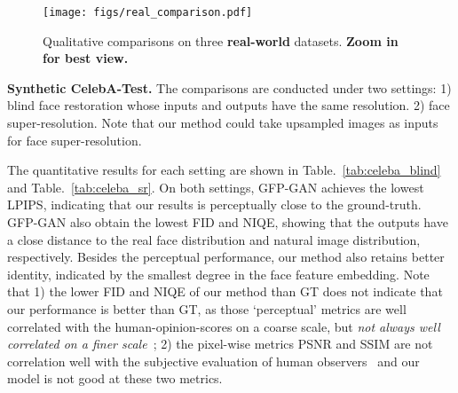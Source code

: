 \documentclass[final]{cvpr}
\begin{document}
\begin{figure*}[!t]
	\vspace{-0.5cm}
	\begin{center}
\texttt{[image: figs/real\_comparison.pdf]}
	\end{center}
	\vspace{-0.8cm}
	\caption{Qualitative comparisons on three \textbf{real-world} datasets. \textbf{Zoom in for best view.}}
	\label{fig:real_comparison}
	\vspace{-0.5cm}
\end{figure*}



\noindent\textbf{Synthetic CelebA-Test.}
The comparisons are conducted under two settings:  1) blind face restoration whose inputs and outputs have the same resolution. 2)  face super-resolution. Note that our method could take upsampled images as inputs for face super-resolution.

The quantitative results for each setting are shown in Table.~\ref{tab:celeba_blind} and Table.~\ref{tab:celeba_sr}. 
On both settings, GFP-GAN achieves the lowest LPIPS, indicating that our results is perceptually close to the ground-truth. GFP-GAN also obtain the lowest FID and NIQE, showing that the outputs have a close distance to the real face distribution and natural image distribution, respectively. 
Besides the perceptual performance, our method also retains better identity, indicated by the smallest degree in the face feature embedding. Note that 1) the lower FID and NIQE of our method than GT does not indicate that our performance is better than GT, as those `perceptual' metrics are well correlated with the human-opinion-scores on a coarse scale, but \textit{not always well correlated on a finer scale}~\cite{blau20182018}; 2) the pixel-wise metrics PSNR and SSIM are not correlation well with the subjective evaluation of human observers~\cite{blau20182018,ledig2017srgan} and our model is not good at these two metrics.
\end{document}
